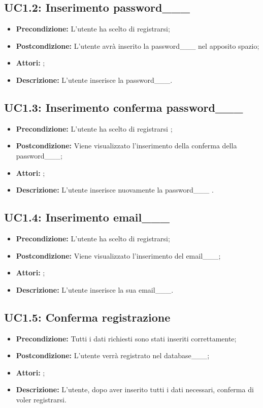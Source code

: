 \subsection{ UC1.2: Inserimento password___}

\begin{itemize}
	\item \textbf{Precondizione:} L'utente ha scelto di registrarsi;
	\item \textbf{Postcondizione:} L'utente avrà inserito la password___ nel apposito spazio;
	\item \textbf{Attori:} ;
	\item \textbf{Descrizione:} L'utente inserisce la password___.
\end{itemize}
\subsection{ UC1.3: Inserimento conferma password___}

\begin{itemize}
	\item \textbf{Precondizione:} L'utente ha scelto di registrarsi ;
	\item \textbf{Postcondizione:} Viene visualizzato l'inserimento della conferma della password___;
	\item \textbf{Attori:} ;
	\item \textbf{Descrizione:} L'utente inserisce nuovamente la password___ .
\end{itemize}
\subsection{ UC1.4: Inserimento email___}

\begin{itemize}
	\item \textbf{Precondizione:} L'utente ha scelto di registrarsi;
	\item \textbf{Postcondizione:} Viene visualizzato l'inserimento del email___;
	\item \textbf{Attori:} ;
	\item \textbf{Descrizione:} L'utente inserisce la sua email___.
\end{itemize}
\subsection{ UC1.5: Conferma registrazione}

\begin{itemize}
	\item \textbf{Precondizione:} Tutti i dati richiesti sono stati inseriti correttamente;
	\item \textbf{Postcondizione:} L'utente verrà registrato nel database___;
	\item \textbf{Attori:} ;
	\item \textbf{Descrizione:} L'utente, dopo aver inserito tutti i dati necessari,  conferma di voler registrarsi.
\end{itemize}
